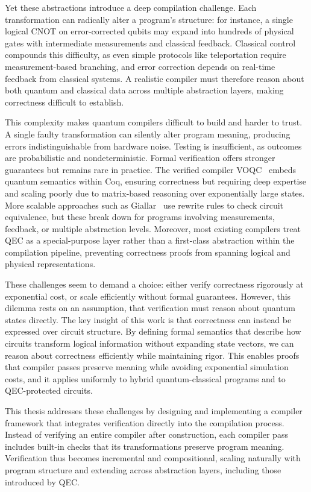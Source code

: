 Yet these abstractions introduce a deep compilation challenge. Each transformation can radically alter a program's structure: for instance, a single logical CNOT on error-corrected qubits may expand into hundreds of physical gates with intermediate measurements and classical feedback. Classical control compounds this difficulty, as even simple protocols like teleportation require measurement-based branching, and error correction depends on real-time feedback from classical systems. A realistic compiler must therefore reason about both quantum and classical data across multiple abstraction layers, making correctness difficult to establish.

This complexity makes quantum compilers difficult to build and harder to trust. A single faulty transformation can silently alter program meaning, producing errors indistinguishable from hardware noise. Testing is insufficient, as outcomes are probabilistic and nondeterministic. Formal verification offers stronger guarantees but remains rare in practice. The verified compiler VOQC~\cite{Hietala_2021} embeds quantum semantics within Coq, ensuring correctness but requiring deep expertise and scaling poorly due to matrix-based reasoning over exponentially large states. More scalable approaches such as Giallar~\cite{tao2022giallar} use rewrite rules to check circuit equivalence, but these break down for programs involving measurements, feedback, or multiple abstraction levels. Moreover, most existing compilers treat QEC as a special-purpose layer rather than a first-class abstraction within the compilation pipeline, preventing correctness proofs from spanning logical and physical representations.

These challenges seem to demand a choice: either verify correctness rigorously at exponential cost, or scale efficiently without formal guarantees. However, this dilemma rests on an assumption, that verification must reason about quantum states directly. The key insight of this work is that correctness can instead be expressed over circuit structure. By defining formal semantics that describe how circuits transform logical information without expanding state vectors, we can reason about correctness efficiently while maintaining rigor. This enables proofs that compiler passes preserve meaning while avoiding exponential simulation costs, and it applies uniformly to hybrid quantum-classical programs and to QEC-protected circuits.

This thesis addresses these challenges by designing and implementing a compiler framework that integrates verification directly into the compilation process. Instead of verifying an entire compiler after construction, each compiler pass includes built-in checks that its transformations preserve program meaning. Verification thus becomes incremental and compositional, scaling naturally with program structure and extending across abstraction layers, including those introduced by QEC.

